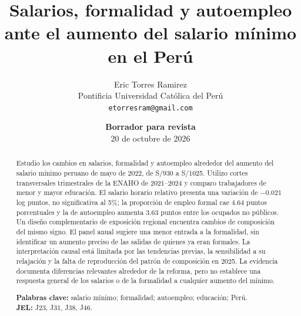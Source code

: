 \documentclass[12pt]{article}
\title{\textbf{Salarios, formalidad y autoempleo ante el aumento del salario mínimo en el Perú}}
\author{Eric Torres Ramirez\\\small Pontificia Universidad Católica del Perú\\\small\texttt{etorresram@gmail.com}}
\date{\textbf{Borrador para revista}\\20 de octubre de 2026}
\begin{document}
\maketitle
\begin{abstract}
\noindent Estudio los cambios en salarios, formalidad y autoempleo alrededor del aumento del salario mínimo peruano de mayo de 2022, de S/930 a S/1025. Utilizo cortes transversales trimestrales de la ENAHO de 2021--2024 y comparo trabajadores de menor y mayor educación. El salario horario relativo presenta una variación de $-0.021$ log puntos, no significativa al 5\%; la proporción de empleo formal cae 4.64 puntos porcentuales y la de autoempleo aumenta 3.63 puntos entre los ocupados no públicos. Un diseño complementario de exposición regional encuentra cambios de composición del mismo signo. El panel anual sugiere una menor entrada a la formalidad, sin identificar un aumento preciso de las salidas de quienes ya eran formales. La interpretación causal está limitada por las tendencias previas, la sensibilidad a su relajación y la falta de reproducción del patrón de composición en 2025. La evidencia documenta diferencias relevantes alrededor de la reforma, pero no establece una respuesta general de los salarios o de la formalidad a cualquier aumento del mínimo.
\medskip

\noindent\textbf{Palabras clave:} salario mínimo; formalidad; autoempleo; educación; Perú.\\
\noindent\textbf{JEL:} J23, J31, J38, J46.
\end{abstract}

\FloatBarrier

\clearpage
\appendix

\end{document}
